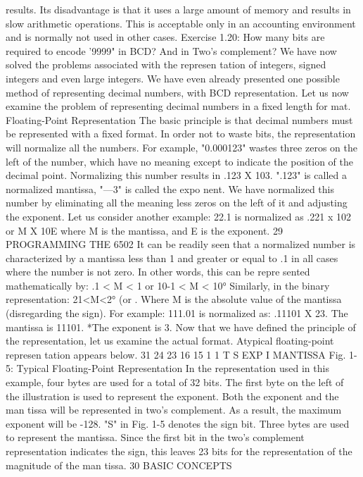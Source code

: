 \documentclass{book}
\begin{document}
results. Its disadvantage is that it uses a large amount of memory
and results in slow arithmetic operations. This is acceptable only
in an accounting environment and is normally not used in other
cases.
Exercise 1.20: How many bits are required to encode '9999" in BCD?
And in Two's complement?
We have now solved the problems associated with the represen
tation of integers, signed integers and even large integers. We
have even already presented one possible method of representing
decimal numbers, with BCD representation. Let us now examine
the problem of representing decimal numbers in a fixed length for
mat.
Floating-Point Representation
The basic principle is that decimal numbers must be represented
with a fixed format. In order not to waste bits, the representation
will normalize all the numbers.
For example, "0.000123" wastes three zeros on the left of the
number, which have no meaning except to indicate the position of
the decimal point. Normalizing this number results in .123 X 103.
".123" is called a normalized mantissa, "—3" is called the expo
nent. We have normalized this number by eliminating all the meaning
less zeros on the left of it and adjusting the exponent.
Let us consider another example:
22.1 is normalized as .221 x 102
or M X 10E where M is the mantissa, and E is the exponent.
29
PROGRAMMING THE 6502
It can be readily seen that a normalized number is characterized
by a mantissa less than 1 and greater or equal to .1 in all cases
where the number is not zero. In other words, this can be repre
sented mathematically by:
.1 < M < 1 or 10-1 < M < 10°
Similarly, in the binary representation:
21<M<2° (or .
Where M is the absolute value of the mantissa (disregarding the
sign).
For example:
111.01 is normalized as: .11101 X 23.
The mantissa is 11101.
*The exponent is 3.
Now that we have defined the principle of the representation,
let us examine the actual format. Atypical floating-point represen
tation appears below.
31 24 23 16 15
1 1 T
S EXP
I
MANTISSA
Fig. 1-5: Typical Floating-Point Representation
In the representation used in this example, four bytes are used
for a total of 32 bits. The first byte on the left of the illustration is
used to represent the exponent. Both the exponent and the man
tissa will be represented in two's complement. As a result, the
maximum exponent will be -128. "S" in Fig. 1-5 denotes the sign
bit.
Three bytes are used to represent the mantissa. Since the first
bit in the two's complement representation indicates the sign, this
leaves 23 bits for the representation of the magnitude of the man
tissa.
30
BASIC CONCEPTS
\end{document}
